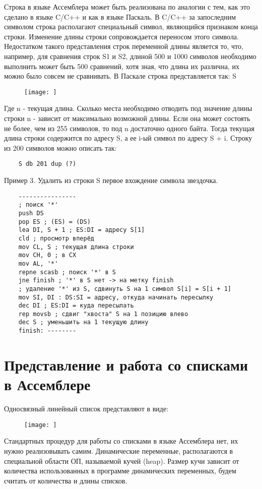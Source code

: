 Строка в языке Ассемблера может быть реализована по аналогии с тем, как это сделано в языке C/C++ и как в языке Паскаль. В C/C++ за запоследним символом строка располагают специальный символ, являющийся признаком конца строки.
Изменение длины строки сопровождается переносом этого символа. Недостатком такого представления строк переменной длины является то, что, например, для сравнения строк S1 и S2, длиной 500 и 1000 символов необходимо выполнить может быть 500 сравнений, хотя зная,
что длина их различна, их можно было совсем не сравнивать.
В Паскале строка представляется так:
S
\begin{figure}[H]
    \texttt{[image: ]}
\end{figure}
Где n - текущая длина. Сколько места необходимо отводить под значение длины строки n - зависит от максимально возможной длины. Если она может состоять не более, чем из 255 символов, то под n достаточно одного байта.
Тогда текущая длина строки содержится по адресу S, а ее i-ый символ по адресу S + i. Строку из 200 символов можно описать так:
\begin{verbatim}
    S db 201 dup (?)
\end{verbatim}

Пример 3. Удалить из строки S первое вхождение символа звездочка.
\begin{verbatim}
    ----------------
    ; поиск '*'
    push DS
    pop ES ; (ES) = (DS)
    lea DI, S + 1 ; ES:DI = адресу S[1]
    cld ; просмотр вперёд
    mov CL, S ; текущая длина строки
    mov CH, 0 ; в CX
    mov AL, '*'
    repne scasb ; поиск '*' в S
    jne finish ; '*' в S нет -> на метку finish
    ; удаление '*' из S, сдвинуть S на 1 символ S[i] = S[i + 1]
    mov SI, DI : DS:SI = адресу, откуда начинать пересылку
    dec DI ; ES:DI = куда пересылать
    rep movsb ; сдвиг "хвоста" S на 1 позицию влево
    dec S ; уменьшить на 1 текущую длину
    finish: --------
\end{verbatim}

\section{Представление и работа со списками в  Ассемблере}

Односвязный линейный список представляют в виде:
\begin{figure}[H]
    \texttt{[image: ]}
\end{figure}

Стандартных процедур для работы со списками в языке Ассемблера нет, их нужно реализовывать самим. Динамические переменные, располагаются в специальной области ОП, называемой кучей (heap). Размер кучи зависит от количества использованных в программе динамических переменных, будем считать от количества и длины списков.

